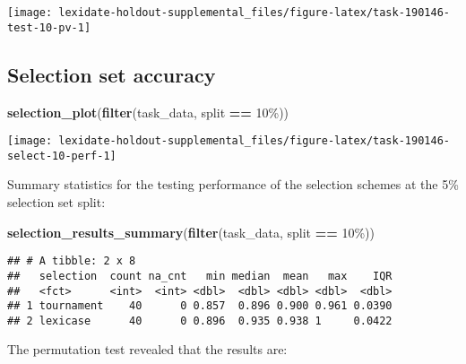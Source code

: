 \documentclass[
]{book}
\newenvironment{Shaded}{\begin{snugshade}}{\end{snugshade}}
\newcommand{\FunctionTok}[1]{\textcolor[rgb]{0.13,0.29,0.53}{\textbf{#1}}}
\newcommand{\NormalTok}[1]{#1}
\newcommand{\SpecialCharTok}[1]{\textcolor[rgb]{0.81,0.36,0.00}{\textbf{#1}}}
\newcommand{\StringTok}[1]{\textcolor[rgb]{0.31,0.60,0.02}{#1}}
\begin{document}
\texttt{[image: lexidate-holdout-supplemental\_files/figure-latex/task-190146-test-10-pv-1]}

\hypertarget{selection-set-accuracy-16}{%
\subsection{Selection set accuracy}\label{selection-set-accuracy-16}}

\begin{Shaded}
\begin{Highlighting}[]
\FunctionTok{selection\_plot}\NormalTok{(}\FunctionTok{filter}\NormalTok{(task\_data, split }\SpecialCharTok{==} \StringTok{\textquotesingle{}10\%\textquotesingle{}}\NormalTok{))}
\end{Highlighting}
\end{Shaded}

\texttt{[image: lexidate-holdout-supplemental\_files/figure-latex/task-190146-select-10-perf-1]}

Summary statistics for the testing performance of the selection schemes at the 5\% selection set split:

\begin{Shaded}
\begin{Highlighting}[]
\FunctionTok{selection\_results\_summary}\NormalTok{(}\FunctionTok{filter}\NormalTok{(task\_data, split }\SpecialCharTok{==} \StringTok{\textquotesingle{}10\%\textquotesingle{}}\NormalTok{))}
\end{Highlighting}
\end{Shaded}

\begin{verbatim}
## # A tibble: 2 x 8
##   selection  count na_cnt   min median  mean   max    IQR
##   <fct>      <int>  <int> <dbl>  <dbl> <dbl> <dbl>  <dbl>
## 1 tournament    40      0 0.857  0.896 0.900 0.961 0.0390
## 2 lexicase      40      0 0.896  0.935 0.938 1     0.0422
\end{verbatim}

The permutation test revealed that the results are:
\end{document}
